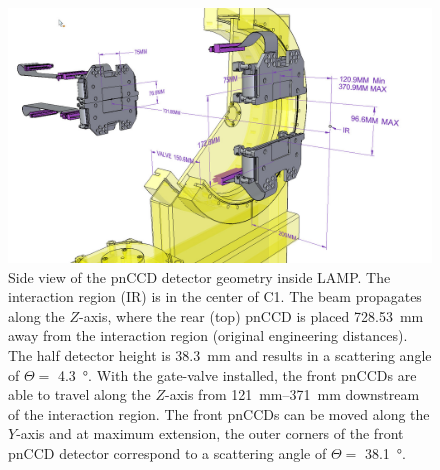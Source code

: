 \begin{figure}
	\centering
		\includegraphics[width=1.0\textwidth]{images/pnCCD-dimensions.jpg}
	\caption[pnCCD detector geometry in the LAMP instrument.]{Side view of the pnCCD detector geometry inside LAMP. The interaction region (IR) is in the center of C1. The beam propagates along the $Z$-axis, where the rear (top) pnCCD is placed \SI{728.53}{\milli\meter} away from the interaction region (original engineering distances). The half detector height is \SI{38.3}{\milli\meter} and results in a scattering angle of $\Theta =$ \SI{4.3}{\degree}. With the gate-valve installed, the front pnCCDs are able to travel along the $Z$-axis from \SIrange{121}{371}{\milli\meter} downstream of the interaction region. The front pnCCDs can be moved along the $Y$-axis and at maximum extension, the outer corners of the front pnCCD detector correspond to a scattering angle of $\Theta=$ \SI{38.1}{\degree}.}
	\label{fig:pnCCD-dimensions}
\end{figure}
